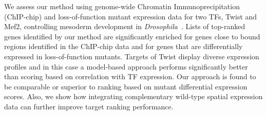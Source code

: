 \documentclass[accepted]{article}
\begin{document}
We assess our method using genome-wide Chromatin Immunoprecipitation
(ChIP-chip) and loss-of-function mutant expression data for two TFs,
Twist and Mef2, controlling mesoderm development in {\it
  Drosophila}~\citep{Zinzen2009}. Lists of top-ranked genes identified
by our method are significantly enriched for genes close to bound
regions identified in the ChIP-chip data and for genes that are
differentially expressed in loss-of-function mutants. Targets of Twist
display diverse expression profiles and in this case a model-based
approach performs significantly better than scoring based on
correlation with TF expression. Our approach is found to be comparable
or superior to ranking based on mutant differential expression
scores. Also, we show how integrating complementary wild-type spatial
expression data can further improve target ranking performance.


\end{document}
